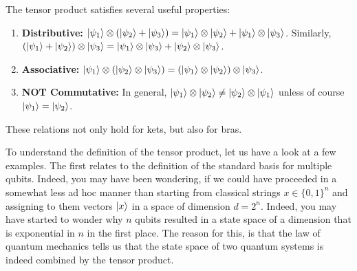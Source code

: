 \begin{proposition}
    The tensor product satisfies several useful properties:
    \begin{enumerate}
        \item \textbf{Distributive: }$\ket{\psi_1}\otimes (\ket{\psi_2}+\ket{\psi_3})=\ket{\psi_1}\otimes \ket{\psi_2}+\ket{\psi_1}\otimes \ket{\psi_3}$. Similarly, $(\ket{\psi_1}+\ket{\psi_2})\otimes \ket{\psi_3}=\ket{\psi_1}\otimes \ket{\psi_3}+\ket{\psi_2}\otimes \ket{\psi_3}$.
        \item \textbf{Associative: }$\ket{\psi_1}\otimes (\ket{\psi_2}\otimes \ket{\psi_3})=(\ket{\psi_1}\otimes \ket{\psi_2})\otimes \ket{\psi_3}$.
        \item \textbf{NOT Commutative: }In general, $\ket{\psi_1}\otimes \ket{\psi_2} \neq \ket{\psi_2} \otimes \ket{\psi_1}$ unless of course $\ket{\psi_1}=\ket{\psi_2}$.
    \end{enumerate}
    These relations not only hold for kets, but also for bras.
\end{proposition}
To understand the definition of the tensor product, let us have a look at a few examples. The
first relates to the definition of the standard basis for multiple qubits. Indeed, you may have been
wondering, if we could have proceeded in a somewhat less ad hoc manner than starting from
classical strings $x \in \{0,1\}^n$ and assigning to them vectors $\ket{x}$ in a space of dimension $d = 2^n$.
Indeed, you may have started to wonder why $n$ qubits resulted in a state space of a dimension that
is exponential in $n$ in the first place. The reason for this, is that the law of quantum mechanics tells
us that the state space of two quantum systems is indeed combined by the tensor product.

